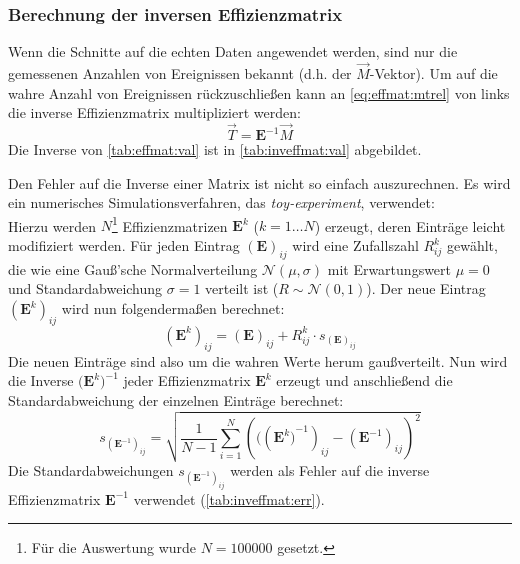 \subsubsection{Berechnung der inversen Effizienzmatrix}
Wenn die Schnitte auf die echten Daten angewendet werden, sind nur die gemessenen Anzahlen von Ereignissen bekannt
(d.h. der $\vec{M}$-Vektor). Um auf die wahre Anzahl von Ereignissen rückzuschließen kann an \autoref{eq:effmat:mtrel}
von links die inverse Effizienzmatrix multipliziert werden:
\begin{equation}
    \vec{T} = \bm{E}^{-1} \vec{M}
\end{equation}
Die Inverse von \autoref{tab:effmat:val} ist in \autoref{tab:inveffmat:val} abgebildet.

Den Fehler auf die Inverse einer Matrix ist nicht so einfach auszurechnen. Es wird ein numerisches Simulationsverfahren,
das \emph{toy-experiment}, verwendet: \\
Hierzu werden $N$\footnote{Für die Auswertung wurde $N=100000$ gesetzt.} Effizienzmatrizen $\bm{E}^k$ ($k=1 \ldots N$) erzeugt,
deren Einträge leicht modifiziert werden. Für jeden Eintrag $(\bm{E})_{ij}$ wird eine Zufallszahl $R_{ij}^k$
gewählt, die wie eine Gauß'sche Normalverteilung $\mathcal{N}(\mu, \sigma)$ mit Erwartungswert $\mu = 0$ und
Standardabweichung $\sigma = 1$ verteilt ist ($R \sim \mathcal{N}(0, 1)$). Der neue Eintrag $(\bm{E}^k)_{ij}$ wird nun folgendermaßen berechnet:
\begin{equation}
    (\bm{E}^k)_{ij} = (\bm{E})_{ij} + R_{ij}^k \cdot s_{(\bm{E})_{ij}}
\end{equation}
Die neuen Einträge sind also um die wahren Werte herum gaußverteilt. Nun wird die Inverse ${(\bm{E}^k})^{-1}$ jeder
Effizienzmatrix $\bm{E}^k$ erzeugt und
anschließend die Standardabweichung der einzelnen Einträge berechnet:
\begin{equation}
    s_{(\bm{E}^{-1})_{ij}} = \sqrt{\frac{1}{N-1} \sum_{i=1}^{N} \left((({\bm{E}^k)}^{-1})_{ij} - (\bm{E}^{-1})_{ij} \right)^2 }
\end{equation}
Die Standardabweichungen $s_{(\bm{E}^{-1})_{ij}}$ werden als Fehler auf die inverse Effizienzmatrix $\bm{E}^{-1}$ verwendet
(\autoref{tab:inveffmat:err}).

